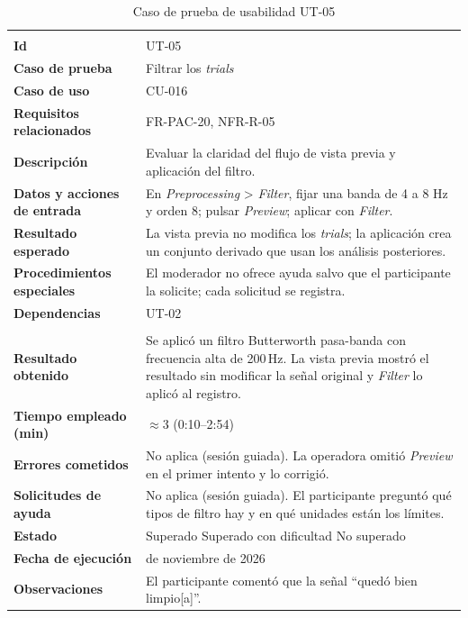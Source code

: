 \documentclass[12pt,letterpaper,oneside]{article}
\DeclareRobustCommand{\_}{\textunderscore\allowbreak}
\newcommand{\fechasesion}{11 de noviembre de 2026}
\newcommand{\casilla}[1]{%
    \fbox{\makebox[1em][c]{#1}}%
}
\begin{document}
\begin{center}
\small
\begin{longtable}{|>{\raggedright\arraybackslash}p{}|>{\raggedright\arraybackslash}p{}|}
\hline
\endfirsthead
\hline
\endhead
\hline
\endfoot
\hline
\caption{Caso de prueba de usabilidad UT-05} \label{tab:ut-05} \\
\endlastfoot
\textbf{Id} & UT-05 \\
\hline
\textbf{Caso de prueba} & Filtrar los \textit{trials} \\
\hline
\textbf{Caso de uso} & CU-016 \\
\hline
\textbf{Requisitos relacionados} & FR-PAC-20, NFR-R-05 \\
\hline
\textbf{Descripción} & Evaluar la claridad del flujo de vista previa y aplicación del filtro. \\
\hline
\textbf{Datos y acciones de entrada} & En \textit{Preprocessing} > \textit{Filter}, fijar una banda de 4 a 8 Hz y orden 8; pulsar \textit{Preview}; aplicar con \textit{Filter}. \\
\hline
\textbf{Resultado esperado} & La vista previa no modifica los \textit{trials}; la aplicación crea un conjunto derivado que usan los análisis posteriores. \\
\hline
\textbf{Procedimientos especiales} & El moderador no ofrece ayuda salvo que el participante la solicite; cada solicitud se registra. \\
\hline
\textbf{Dependencias} & UT-02 \\
\hline
\multicolumn{2}{|c|}{\textbf{Información para el seguimiento}} \\
\hline
\textbf{Resultado obtenido} & Se aplicó un filtro Butterworth pasa-banda con frecuencia alta de 200\,Hz. La vista previa mostró el resultado sin modificar la señal original y \textit{Filter} lo aplicó al registro. \\
\hline
\textbf{Tiempo empleado (min)} & $\approx$3 (0:10--2:54) \\
\hline
\textbf{Errores cometidos} & No aplica (sesión guiada). La operadora omitió \textit{Preview} en el primer intento y lo corrigió. \\
\hline
\textbf{Solicitudes de ayuda} & No aplica (sesión guiada). El participante preguntó qué tipos de filtro hay y en qué unidades están los límites. \\
\hline
\textbf{Estado} & \casilla{x} Superado \qquad \casilla{} Superado con dificultad \qquad \casilla{} No superado \\
\hline
\textbf{Fecha de ejecución} & \fechasesion \\
\hline
\textbf{Observaciones} & El participante comentó que la señal ``quedó bien limpio[a]''. \\
\hline
\end{longtable}
\end{center}
\end{document}

